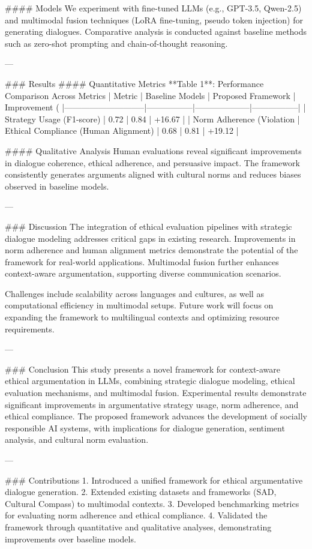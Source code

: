 #### Models  
We experiment with fine-tuned LLMs (e.g., GPT-3.5, Qwen-2.5) and multimodal fusion techniques (LoRA fine-tuning, pseudo token injection) for generating dialogues. Comparative analysis is conducted against baseline methods such as zero-shot prompting and chain-of-thought reasoning.

---

### Results  
#### Quantitative Metrics  
**Table 1**: Performance Comparison Across Metrics  
| Metric                      | Baseline Models | Proposed Framework | Improvement (%
|-----------------------------|-----------------|--------------------|-----------------|  
| Strategy Usage (F1-score)   | 0.72            | 0.84               | +16.67          |  
| Norm Adherence (Violation %
| Ethical Compliance (Human Alignment) | 0.68   | 0.81               | +19.12          |  

#### Qualitative Analysis  
Human evaluations reveal significant improvements in dialogue coherence, ethical adherence, and persuasive impact. The framework consistently generates arguments aligned with cultural norms and reduces biases observed in baseline models.

---

### Discussion  
The integration of ethical evaluation pipelines with strategic dialogue modeling addresses critical gaps in existing research. Improvements in norm adherence and human alignment metrics demonstrate the potential of the framework for real-world applications. Multimodal fusion further enhances context-aware argumentation, supporting diverse communication scenarios.

Challenges include scalability across languages and cultures, as well as computational efficiency in multimodal setups. Future work will focus on expanding the framework to multilingual contexts and optimizing resource requirements.

---

### Conclusion  
This study presents a novel framework for context-aware ethical argumentation in LLMs, combining strategic dialogue modeling, ethical evaluation mechanisms, and multimodal fusion. Experimental results demonstrate significant improvements in argumentative strategy usage, norm adherence, and ethical compliance. The proposed framework advances the development of socially responsible AI systems, with implications for dialogue generation, sentiment analysis, and cultural norm evaluation.

---

### Contributions  
1. Introduced a unified framework for ethical argumentative dialogue generation.  
2. Extended existing datasets and frameworks (SAD, Cultural Compass) to multimodal contexts.  
3. Developed benchmarking metrics for evaluating norm adherence and ethical compliance.  
4. Validated the framework through quantitative and qualitative analyses, demonstrating improvements over baseline models.  

